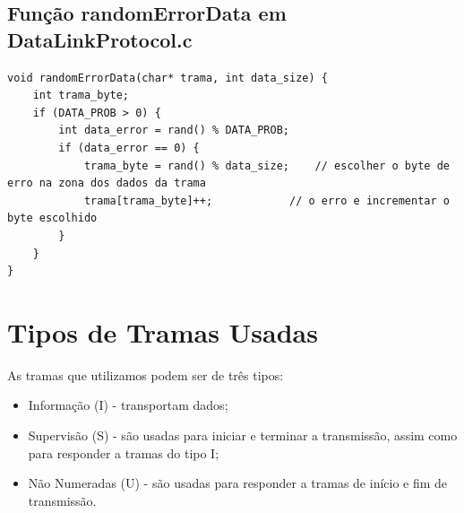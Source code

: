 \documentclass[11pt,a4paper,reqno]{report}
\numberwithin{equation}{section}
\begin{document}
\begin{appendices}
\section{Função randomErrorData em DataLinkProtocol.c }
\label{randomErrorData}
\begin{lstlisting}
void randomErrorData(char* trama, int data_size) {	
	int trama_byte;
	if (DATA_PROB > 0) {
		int data_error = rand() % DATA_PROB;
		if (data_error == 0) {
			trama_byte = rand() % data_size;	// escolher o byte de erro na zona dos dados da trama
			trama[trama_byte]++;			// o erro e incrementar o byte escolhido
		}
	}
}
\end{lstlisting}




\chapter{Tipos de Tramas Usadas}
\label{tramas}

As tramas que utilizamos podem ser de três tipos:
\begin{itemize}
	\item Informação (I) - transportam dados;
	\item Supervisão (S) - são usadas para iniciar e terminar a transmissão, assim como para responder a tramas do tipo I;
	\item Não Numeradas (U) - são usadas para responder a tramas de início e fim de transmissão.
\end{itemize}


\end{appendices}
\end{document}

